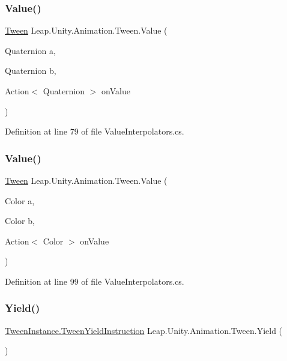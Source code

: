 \subsubsection{\texorpdfstring{Value()}{Value()}\hspace{0.1cm}{\footnotesize\ttfamily [4/5]}}
{\footnotesize\ttfamily \mbox{\hyperlink{struct_leap_1_1_unity_1_1_animation_1_1_tween}{Tween}} Leap.\+Unity.\+Animation.\+Tween.\+Value (\begin{DoxyParamCaption}\item[{Quaternion}]{a,  }\item[{Quaternion}]{b,  }\item[{Action$<$ Quaternion $>$}]{on\+Value }\end{DoxyParamCaption})}



Definition at line 79 of file Value\+Interpolators.\+cs.

\mbox{\label{struct_leap_1_1_unity_1_1_animation_1_1_tween_aab3b83bfba4ff98c4ddb8129501e731b}} 
\subsubsection{\texorpdfstring{Value()}{Value()}\hspace{0.1cm}{\footnotesize\ttfamily [5/5]}}
{\footnotesize\ttfamily \mbox{\hyperlink{struct_leap_1_1_unity_1_1_animation_1_1_tween}{Tween}} Leap.\+Unity.\+Animation.\+Tween.\+Value (\begin{DoxyParamCaption}\item[{Color}]{a,  }\item[{Color}]{b,  }\item[{Action$<$ Color $>$}]{on\+Value }\end{DoxyParamCaption})}



Definition at line 99 of file Value\+Interpolators.\+cs.

\mbox{\label{struct_leap_1_1_unity_1_1_animation_1_1_tween_ae3aea546f6195b60ace0fd614c3925d4}} 
\subsubsection{\texorpdfstring{Yield()}{Yield()}}
{\footnotesize\ttfamily \mbox{\hyperlink{struct_leap_1_1_unity_1_1_animation_1_1_internal_1_1_tween_instance_1_1_tween_yield_instruction}{Tween\+Instance.\+Tween\+Yield\+Instruction}} Leap.\+Unity.\+Animation.\+Tween.\+Yield (\begin{DoxyParamCaption}{ }\end{DoxyParamCaption})}




